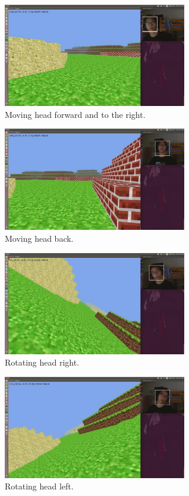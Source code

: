\documentclass[10pt,twocolumn,letterpaper]{article}
\begin{document}
\begin{figure}[ht!]
\centering
\includegraphics[width=80mm]{forward.jpg}
\caption{Moving head forward and to the right.\label{overflow}}
\end{figure}

\begin{figure}[ht!]
\centering
\includegraphics[width=80mm]{back_away.jpg}
\caption{Moving head back.\label{overflow}}
\end{figure}

\begin{figure}[ht!]
\centering
\includegraphics[width=80mm]{rotation_left.jpg}
\caption{Rotating head right.\label{overflow}}
\end{figure}

\begin{figure}[ht!]
\centering
\includegraphics[width=80mm]{rotation_right.jpg}
\caption{Rotating head left.\label{overflow}}
\end{figure}
\end{document}
